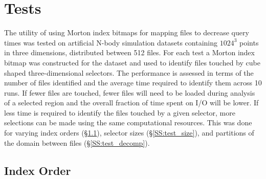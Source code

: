 \documentclass[apjl]{emulateapj}
\begin{document}
\section{Tests}\label{S:tests}
The utility of using Morton index bitmaps for mapping files to decrease query times was tested on artificial N-body simulation datasets containing $1024^3$ points in three dimensions, distributed between 512 files. For each test a Morton index bitmap was constructed for the dataset and used to identify files touched by cube shaped three-dimensional selectors. The performance is assessed in terms of the number of files identified and the average time required to identify them across 10 runs. If fewer files are touched, fewer files will need to be loaded during analysis of a selected region and the overall fraction of time spent on I/O will be lower. If less time is required to identify the files touched by a given selector, more selections can be made using the same computational resources. This was done for varying index orders (\S\ref{SS:test_order}), selector sizes (\S\ref{SS:test_size}), and partitions of the domain between files (\S\ref{SS:test_decomp}).

\subsection{Index Order}\label{SS:test_order}
\end{document}
